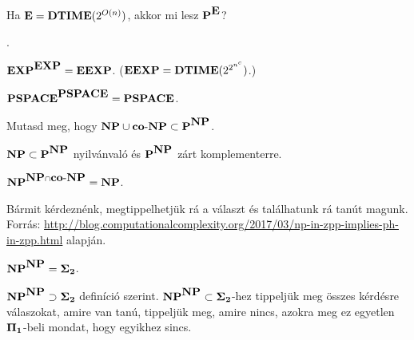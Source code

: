\begin{Exercise}[counter={sorszam}, difficulty=0]
	Ha $\E=\DTIME(2^{O(n)})$, akkor mi lesz $\P^{\E}$?
\end{Exercise}	
\begin{Answer}
	\EXP.
\end{Answer}

\begin{Exercise}[counter={sorszam}, difficulty=0]
	$\EXP^{\EXP} = \cl{EEXP}$. ($\cl{EEXP} = \DTIME(2^{2^{n^c}})$.)
\end{Exercise}


\begin{Exercise}[counter={sorszam}, difficulty=0]
	$\PSPACE^{\PSPACE}=\PSPACE$.
\end{Exercise}	


\begin{Exercise}[counter={sorszam}, difficulty=0]
	Mutasd meg, hogy $\NP\cup \coNP\subset \P^{\NP}$.
\end{Exercise}	
\begin{Answer}
	$\NP\subset \P^{\NP}$ nyilv\'anval\'o \'es $\P^{\NP}$ z\'art komplementerre.
\end{Answer}


\begin{Exercise}[counter={sorszam}, difficulty=0]
	$\NP^{\NP\cap \coNP}= \NP$.
\end{Exercise}	
\begin{Answer}
	B\'armit k\'erdezn\'enk, megtippelhetj\"uk r\'a a v\'alaszt \'es tal\'alhatunk r\'a tan\'ut magunk.\\
	Forr\'as: \url{http://blog.computationalcomplexity.org/2017/03/np-in-zpp-implies-ph-in-zpp.html} alapj\'an.
\end{Answer}


\begin{Exercise}[counter={sorszam}, difficulty=0]
	$\NP^{\NP}= \Sigmatwo$.
\end{Exercise}	
\begin{Answer}
	$\NP^{\NP}\supset \Sigmatwo$ defin\'ici\'o szerint.
	$\NP^{\NP}\subset \Sigmatwo$-hez tippelj\"uk meg \"osszes k\'erd\'esre v\'alaszokat, amire van tan\'u, tippelj\"uk meg, amire nincs, azokra meg ez egyetlen $\Pione$-beli mondat, hogy egyikhez sincs.
\end{Answer}

